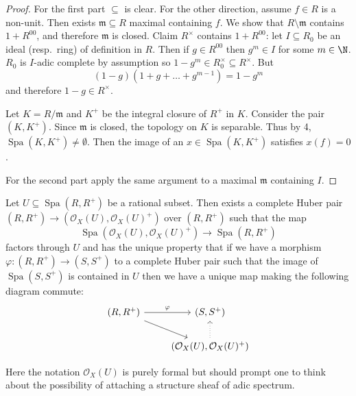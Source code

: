 \documentclass[a4paper]{article}
\newcommand{\sh}[1]{\mathcal{#1}} %
\DeclareMathOperator{\Spa}{Spa}
\begin{document}
\begin{proof}
  For the first part \(\subseteq\) is clear. For the other direction, assume \(f \in R\) is a non-unit. Then exists \(\mathfrak m \subseteq R\) maximal containing \(f\). We show that \(R \setminus \mathfrak{m}\) contains \(1 + R^{00}\), and therefore \(\mathfrak m\) is closed. Claim \(R^\times\) contains \(1 + R^{00}\): let \(I \subseteq R_0\) be an ideal (resp.\ ring) of definition in \(R\). Then if \(g \in R^{00}\) then \(g^m \in I\) for some \(m \in \N\). \(R_0\) is \(I\)-adic complete by assumption so \(1 - g^m \in R_0^\times \subseteq R^\times\). But
  \[
    (1 - g) (1 + g + \dots + g^{m - 1}) = 1 - g^m
  \]
  and therefore \(1 - g \in R^\times\).

  Let \(K = R/\mathfrak{m}\) and \(K^+\) be the integral closure of \(R^+\) in \(K\). Consider the pair \((K, K^+)\). Since \(\mathfrak{m}\) is closed, the topology on \(K\) is separable. Thus by  4, \(\Spa(K, K^+) \ne \emptyset\). Then the image of an \(x \in \Spa(K, K^+)\) satisfies \(x(f) = 0\).

  For the second part apply the same argument to a maximal \(\mathfrak m\) containing \(I\).
\end{proof}

\begin{theorem}
  Let \(U \subseteq \Spa(R, R^+)\) be a rational subset. Then exists a complete Huber pair \((R, R^+) \to (\sh O_X(U), \sh O_X(U)^+)\) over \((R, R^+)\) such that the map
  \[
    \Spa(\sh O_X(U), \sh O_X(U)^+) \to \Spa(R, R^+)
  \]
  factors through \(U\) and has the unique property that if we have a morphism \(\varphi: (R, R^+) \to (S, S^+)\) to a complete Huber pair such that the image of \(\Spa(S, S^+)\) is contained in \(U\) then we have a unique map making the following diagram commute:
  \[
    \begin{tikzcd}
      (R, R^+) \ar[r, "\varphi"] \ar[dr] & (S, S^+) \\
      & (\sh O_X(U), \sh O_X(U)^+) \ar[u, dotted]
    \end{tikzcd}
  \]
\end{theorem}
Here the notation \(\sh O_X(U)\) is purely formal but should prompt one to think about the possibility of attaching a structure sheaf of adic spectrum.
\end{document}
